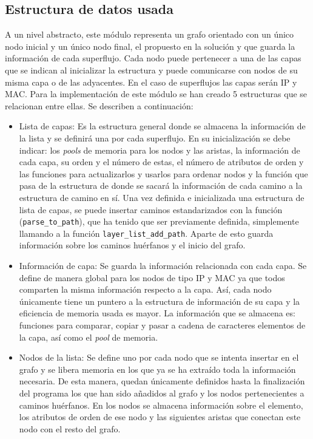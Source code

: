 \documentclass[tfg,epsbased,lof,lot,loa,final,nocopyright,overleaf]{tfgtfmthesisuam}
\begin{document}
\subsection{Estructura de datos usada}
A un nivel abstracto, este módulo representa un grafo orientado con un único nodo inicial y un único nodo final, el propuesto en la solución y que guarda la información de cada superflujo. Cada nodo puede pertenecer a una de las capas que se indican al inicializar la estructura y puede comunicarse con nodos de su misma capa o de las adyacentes. En el caso de superflujos las capas serán IP y MAC. Para la implementación de este módulo se han creado 5 estructuras que se relacionan entre ellas. Se describen a continuación:
\begin{itemize}
    \item Lista de capas: Es la estructura general donde se almacena la información de la lista y se definirá una por cada superflujo. En su inicialización se debe indicar: los \textit{pools} de memoria para los nodos y las aristas, la información de cada capa, su orden y el número de estas, el número de atributos de orden y las funciones para actualizarlos y usarlos para ordenar nodos y la función que pasa de la estructura de donde se sacará la información de cada camino a la estructura de camino en sí. Una vez definida e inicializada una estructura de lista de capas, se puede insertar caminos estandarizados con la función (\texttt{parse\_to\_path}), que ha tenido que ser previamente definida, simplemente llamando a la función \texttt{layer\_list\_add\_path}. Aparte de esto guarda información sobre los caminos huérfanos y el inicio del grafo.
    \item Información de capa: Se guarda la información relacionada con cada capa. Se define de manera global para los nodos de tipo IP y MAC ya que todos comparten la misma información respecto a la capa. Así, cada nodo únicamente tiene un puntero a la estructura de información de su capa y la eficiencia de memoria usada es mayor. La información que se almacena es: funciones para comparar, copiar y pasar a cadena de caracteres elementos de la capa, así como el \textit{pool} de memoria.
    \item Nodos de la lista: Se define uno por cada nodo que se intenta insertar en el grafo y se libera memoria en los que ya se ha extraído toda la información necesaria. De esta manera, quedan únicamente definidos hasta la finalización del programa los que han sido añadidos al grafo y los nodos pertenecientes a caminos huérfanos.  En los nodos se almacena información sobre el elemento, los atributos de orden de ese nodo y las siguientes aristas que conectan este nodo con el resto del grafo.

\end{itemize}
\end{document}
